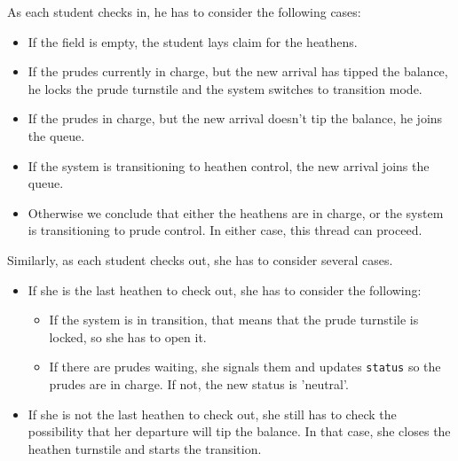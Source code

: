 \documentclass{book}
\begin{document}
As each student checks in, he has to
consider the following cases:

\begin{itemize}

\item If the field is empty, the student lays claim for the heathens.

\item If the prudes currently in charge, but the new arrival
has tipped the balance, he locks the prude turnstile and the
system switches to transition mode.

\item If the prudes in charge, but the new arrival doesn't
tip the balance, he joins the queue.

\item If the system is transitioning to heathen control, the new arrival
joins the queue.

\item Otherwise we conclude that either the heathens are in charge, or the
system is transitioning to prude control.  In either case, this
thread can proceed.

\end{itemize}  

Similarly, as each student checks out, she has to consider several
cases.  

\begin{itemize}

\item If she is the last heathen to check out, she has to
consider the following:

    \begin{itemize}

    \item If the system is in transition, that means that the prude
      turnstile is locked, so she has to open it.

    \item If there are prudes waiting, she signals them and
      updates {\tt status} so the prudes are in charge.  If not, the
      new status is 'neutral'.

    \end{itemize}  

\item If she is not the last heathen to check out, she still has to
check the possibility that her departure will tip the balance.  In
that case, she closes the heathen turnstile and starts the
transition.

\end{itemize}
\end{document}
